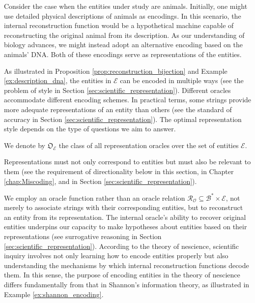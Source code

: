 \begin{example}
\label{ex:description_dna}
Consider the case when the entities under study are animals. Initially, one might use detailed physical descriptions of animals as encodings. In this scenario, the internal reconstruction function would be a hypothetical machine capable of reconstructing the original animal from its description. As our understanding of biology advances, we might instead adopt an alternative encoding based on the animals' DNA. Both of these encodings serve as representations of the entities.
\end{example}

As illustrated in Proposition \ref{prop:reconstruction_bijection} and Example \ref{ex:description_dna}, the entities in $\mathcal{E}$ can be encoded in multiple ways (see the problem of style in Section \ref{sec:scientific_representation}). Different oracles accommodate different encoding schemes. In practical terms, some strings provide more adequate representations of an entity than others (see the standard of accuracy in Section \ref{sec:scientific_representation}). The optimal representation style depends on the type of questions we aim to answer.

\begin{notation}
We denote by $\mathfrak{O}_{\mathcal{E}}$ the class of all representation oracles over the set of entities $\mathcal{E}$.
\end{notation}

Representations must not only correspond to entities but must also be relevant to them (see the requirement of directionality below in this section, in Chapter \ref{chap:Miscoding}, and in Section \ref{sec:scientific_representation}).

We employ an oracle function rather than an oracle relation $\mathcal{R}_\mathcal{O} \subseteq \mathcal{B}^\ast \times \mathcal{E}$, not merely to associate strings with their corresponding entities, but to reconstruct an entity from its representation. The internal oracle's ability to recover original entities underpins our capacity to make hypotheses about entities based on their representations (see surrogative reasoning in Section \ref{sec:scientific_representation}). According to the theory of nescience, scientific inquiry involves not only learning how to encode entities properly but also understanding the mechanisms by which internal reconstruction functions decode them. In this sense, the purpose of encoding entities in the theory of nescience differs fundamentally from that in Shannon's information theory, as illustrated in Example \ref{ex:shannon_encoding}.

